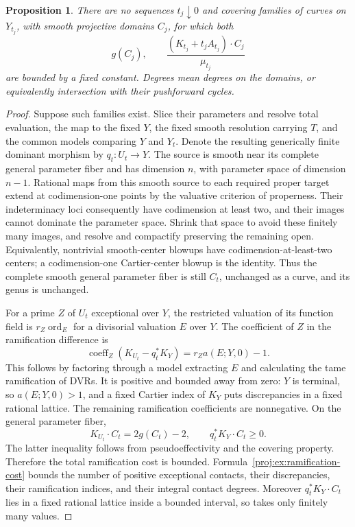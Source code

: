 \documentclass[11pt,letterpaper]{article}
\newtheorem{proposition}[theorem]{Proposition}
\theoremstyle{definition}
\theoremstyle{remark}
\begin{document}
\begin{proposition}\label{proj:prop:bounded-curves}
There are no sequences \(t_j\downarrow0\) and covering
families of curves on \(Y_{t_j}\), with smooth projective
domains \(C_j\), for which both
\[
 g(C_j),\qquad
 \frac{(K_{t_j}+t_jA_{t_j})\cdot C_j}{\mu_{t_j}}
\]
are bounded by a fixed constant. Degrees mean degrees on
the domains, or equivalently intersection with their
pushforward cycles.
\end{proposition}
\begin{proof}
Suppose such families exist. Slice their parameters and
resolve total evaluation, the map to the fixed \(Y\), the
fixed smooth resolution carrying \(T\), and the common
models comparing \(Y\) and \(Y_t\). Denote the resulting
generically finite dominant morphism by \(q_t:U_t\to Y\).
The source is smooth near its complete general parameter
fiber and has dimension \(n\), with parameter space of
dimension \(n-1\). Rational maps from this smooth source
to each required proper target extend at codimension-one
points by the valuative criterion of properness. Their
indeterminacy loci consequently have codimension at least
two, and their images cannot dominate the parameter space.
Shrink that space to avoid these finitely many images,
and resolve and compactify preserving the remaining open.
Equivalently, nontrivial smooth-center blowups have
codimension-at-least-two centers; a codimension-one
Cartier-center blowup is the identity. Thus the complete
smooth general parameter fiber is still \(C_t\), unchanged
as a curve, and its genus is unchanged.

For a prime \(Z\) of \(U_t\) exceptional over \(Y\), the
restricted valuation of its function field is
\(r_Z\operatorname{ord}_E\) for a divisorial valuation \(E\) over \(Y\).
The coefficient of \(Z\) in the ramification difference is
\begin{equation}\label{proj:ex:ramification-cost}
 \operatorname{coeff}_Z(K_{U_t}-q_t^*K_Y)
       =r_Za(E;Y,0)-1.
\end{equation}
This follows by factoring through a model extracting \(E\)
and calculating the tame ramification of DVRs. It is
positive and bounded away from zero: \(Y\) is terminal,
so \(a(E;Y,0)>1\), and a fixed Cartier index of \(K_Y\)
puts discrepancies in a fixed rational lattice. The
remaining ramification coefficients are nonnegative.
On the general parameter fiber,
\[
 K_{U_t}\cdot C_t=2g(C_t)-2,\qquad
 q_t^*K_Y\cdot C_t\geq0.
 \]
The latter inequality follows from pseudoeffectivity and
the covering property. Therefore the total ramification
cost is bounded. Formula~\eqref{proj:ex:ramification-cost}
bounds the number of positive exceptional contacts,
their discrepancies, their ramification indices, and
their integral contact degrees. Moreover
\(q_t^*K_Y\cdot C_t\) lies in a fixed rational lattice
inside a bounded interval, so takes only finitely many
values.


\end{proof}
\end{document}
